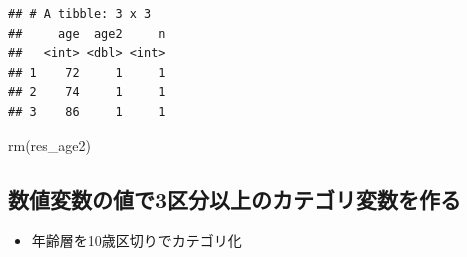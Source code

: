 \documentclass[
  xelatex,ja=standard, b5paper]{bxjsbook}
\newenvironment{Shaded}{\begin{snugshade}}{\end{snugshade}}
\newcommand{\FunctionTok}[1]{\textcolor[rgb]{0.00,0.00,0.00}{#1}}
\newcommand{\NormalTok}[1]{#1}
\providecommand{\tightlist}{%
  \setlength{\itemsep}{0pt}\setlength{\parskip}{0pt}}
\begin{document}
\begin{verbatim}
## # A tibble: 3 x 3
##     age  age2     n
##   <int> <dbl> <int>
## 1    72     1     1
## 2    74     1     1
## 3    86     1     1
\end{verbatim}

\begin{Shaded}
\begin{Highlighting}[]
\FunctionTok{rm}\NormalTok{(res\_age2)}
\end{Highlighting}
\end{Shaded}

\hypertarget{ux6570ux5024ux5909ux6570ux306eux5024ux30673ux533aux5206ux4ee5ux4e0aux306eux30abux30c6ux30b4ux30eaux5909ux6570ux3092ux4f5cux308b}{%
\subsection{数値変数の値で3区分以上のカテゴリ変数を作る}\label{ux6570ux5024ux5909ux6570ux306eux5024ux30673ux533aux5206ux4ee5ux4e0aux306eux30abux30c6ux30b4ux30eaux5909ux6570ux3092ux4f5cux308b}}

\begin{itemize}
\tightlist
\item
  年齢層を10歳区切りでカテゴリ化
\end{itemize}
\end{document}

